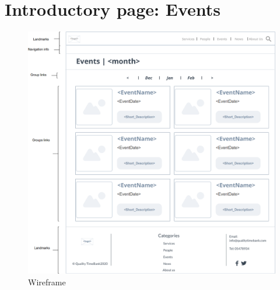 \documentclass[a4paper, 11pt, parskip=half, headsepline]{scrreprt}
\begin{document}
\section{Introductory page: Events}

\begin{figure}[H]
    \centering
    \includegraphics[width=1\linewidth, keepaspectratio]{wireframes/Introductory-Events}
    \caption{Wireframe}
\end{figure}
\end{document}
